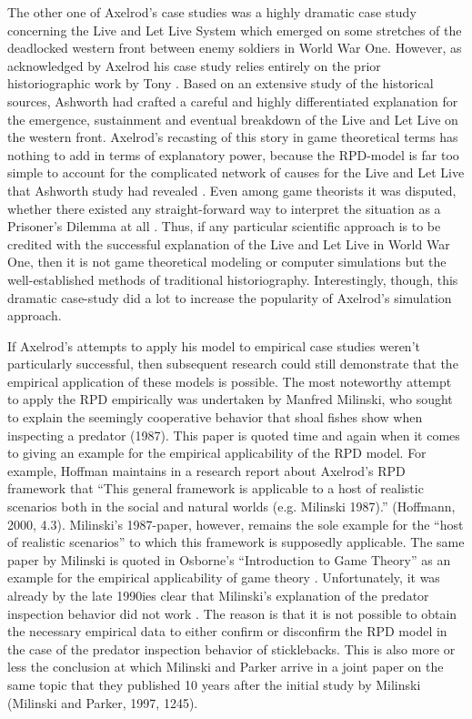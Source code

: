 \documentclass[graybox, English]{svmult}
\begin{document}
The other one of Axelrod's case studies was a highly dramatic case
study concerning the Live and Let Live System which emerged on some
stretches of the deadlocked western front between enemy soldiers in
World War One. However, as acknowledged by Axelrod his case study
relies entirely on the prior historiographic work by Tony
\citet{ashworth:1980}. Based on an extensive study of the historical
sources, Ashworth had crafted a careful and highly differentiated
explanation for the emergence, sustainment and eventual breakdown of
the Live and Let Live on the western front. Axelrod's recasting of
this story in game theoretical terms has nothing to add in terms of
explanatory power, because the RPD-model is far too simple to account
for the complicated network of causes for the Live and Let Live that
Ashworth study had revealed \citep[180ff.]{arnold:2008}. Even among
game theorists it was disputed, whether there existed any
straight-forward way to interpret the situation as a Prisoner's
Dilemma at all \citep[33ff.]{schuessler:1990}. Thus, if any particular
scientific approach is to be credited with the successful explanation
of the Live and Let Live in World War One, then it is not
game theoretical modeling or computer simulations but the
well-established methods of traditional historiography. Interestingly,
though, this dramatic case-study did a lot to increase the popularity
of Axelrod's simulation approach.

If Axelrod's attempts to apply his model to empirical case studies
weren't particularly successful, then subsequent research could still
demonstrate that the empirical application of these models is
possible. The most noteworthy attempt to apply the RPD empirically was
undertaken by Manfred Milinski, who sought to explain the seemingly
cooperative behavior that shoal fishes show when inspecting a predator
(1987). This paper is quoted time and again when it comes to giving an
example for the empirical applicability of the RPD model. For example,
Hoffman maintains in a research report about Axelrod's RPD framework
that “This general framework is applicable to a host of realistic
scenarios both in the social and natural worlds (e.g. Milinski 1987).”
(Hoffmann, 2000, 4.3).  Milinski's 1987-paper, however, remains the
sole example for the “host of realistic scenarios” to which this
framework is supposedly applicable. The same paper by Milinski is
quoted in Osborne's “Introduction to Game Theory” as an example for
the empirical applicability of game theory \citep[445]{osborne:2004}.
Unfortunately, it was already by the late 1990ies clear that
Milinski's explanation of the predator inspection behavior did not
work \citep{dugatkin:1997, dugatkin:1998a}. 
The reason is that it is not possible to obtain the necessary
empirical data to either confirm or disconfirm the RPD model in the
case of the predator inspection behavior of sticklebacks. This is also
more or less the conclusion at which Milinski and Parker arrive in a
joint paper on the same topic that they published 10 years after the
initial study by Milinski (Milinski and Parker, 1997, 1245). 
\end{document}
